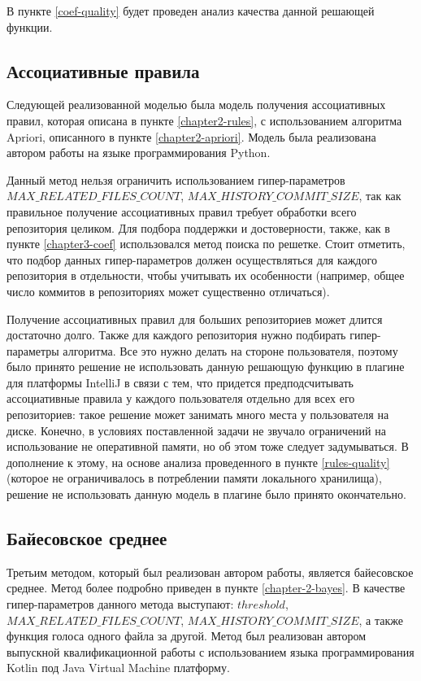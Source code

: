 В пункте \ref{coef-quality} будет проведен анализ качества данной решающей функции.
    \subsection{Ассоциативные правила}
Следующей реализованной моделью была модель получения ассоциативных правил, которая описана в пункте \ref{chapter2-rules}, с использованием алгоритма Apriori, описанного в пункте \ref{chapter2-apriori}. Модель была реализована автором работы на языке программирования Python.

Данный метод нельзя ограничить использованием гипер-параметров $MAX\_RELATED\_FILES\_COUNT$, $MAX\_HISTORY\_COMMIT\_SIZE$, так как правильное получение ассоциативных правил требует обработки всего репозитория целиком. Для подбора поддержки и достоверности, также, как в пункте \ref{chapter3-coef} использовался метод поиска по решетке. Стоит отметить, что подбор данных гипер-параметров должен осуществляться для каждого репозитория в отдельности, чтобы учитывать их особенности (например, общее число коммитов в репозиториях может существенно отличаться).

Получение ассоциативных правил для больших репозиториев может длится достаточно долго. Также для каждого репозитория нужно подбирать гипер-параметры алгоритма. Все это нужно делать на стороне пользователя, поэтому было принято решение не использовать данную решающую функцию в плагине для платформы IntelliJ в связи с тем, что придется предподсчитывать ассоциативные правила у каждого пользователя отдельно для всех его репозиториев: такое решение может занимать много места у пользователя на диске. Конечно, в условиях поставленной задачи не звучало ограничений на использование не оперативной памяти, но об этом тоже следует задумываться. В дополнение к этому, на основе анализа проведенного в пункте \ref{rules-quality} (которое не ограничивалось в потреблении памяти локального хранилища), решение не использовать данную модель в плагине было принято окончательно.

    \subsection{Байесовское среднее}\label{chapter3-bayes}
Третьим методом, который был реализован автором работы, является байесовское среднее. Метод более подробно приведен в пункте \ref{chapter-2-bayes}. В качестве гипер-параметров данного метода выступают: $threshold$, $MAX\_RELATED\_FILES\_COUNT$, $MAX\_HISTORY\_COMMIT\_SIZE$, а также функция голоса одного файла за другой. Метод был реализован автором выпускной квалификационной работы с использованием языка программирования Kotlin под Java Virtual Machine платформу.

